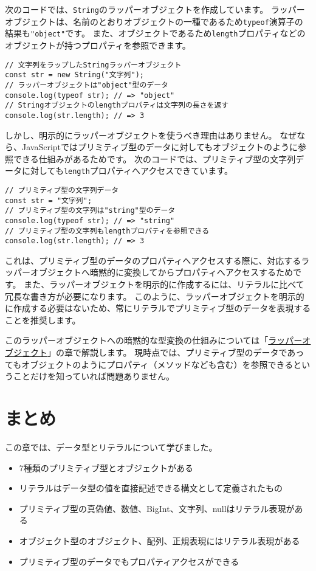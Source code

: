 次のコードでは、\texttt{String}のラッパーオブジェクトを作成しています。
ラッパーオブジェクトは、名前のとおりオブジェクトの一種であるため\texttt{typeof}演算子の結果も\texttt{"object"}です。
また、オブジェクトであるため\texttt{length}プロパティなどのオブジェクトが持つプロパティを参照できます。

\begin{lstlisting}
// 文字列をラップしたStringラッパーオブジェクト
const str = new String("文字列");
// ラッパーオブジェクトは"object"型のデータ
console.log(typeof str); // => "object"
// Stringオブジェクトのlengthプロパティは文字列の長さを返す
console.log(str.length); // => 3
\end{lstlisting}
\newpage
しかし、明示的にラッパーオブジェクトを使うべき理由はありません。
なぜなら、JavaScriptではプリミティブ型のデータに対してもオブジェクトのように参照できる仕組みがあるためです。
次のコードでは、プリミティブ型の文字列データに対しても\texttt{length}プロパティへアクセスできています。

\begin{lstlisting}
// プリミティブ型の文字列データ
const str = "文字列";
// プリミティブ型の文字列は"string"型のデータ
console.log(typeof str); // => "string"
// プリミティブ型の文字列もlengthプロパティを参照できる
console.log(str.length); // => 3
\end{lstlisting}

これは、プリミティブ型のデータのプロパティへアクセスする際に、対応するラッパーオブジェクトへ暗黙的に変換してからプロパティへアクセスするためです。
また、ラッパーオブジェクトを明示的に作成するには、リテラルに比べて冗長な書き方が必要になります。
このように、ラッパーオブジェクトを明示的に作成する必要はないため、常にリテラルでプリミティブ型のデータを表現することを推奨します。

このラッパーオブジェクトへの暗黙的な型変換の仕組みについては「\hyperlink{wrapper-object}{ラッパーオブジェクト}」の章で解説します。
現時点では、プリミティブ型のデータであってもオブジェクトのようにプロパティ（メソッドなども含む）を参照できるということだけを知っていれば問題ありません。

\hypertarget{data-type-summary}{%
\section{まとめ}\label{data-type-summary}}

この章では、データ型とリテラルについて学びました。

\begin{itemize}
\item
  7種類のプリミティブ型とオブジェクトがある
\item
  リテラルはデータ型の値を直接記述できる構文として定義されたもの
\item
  プリミティブ型の真偽値、数値、BigInt、文字列、nullはリテラル表現がある
\item
  オブジェクト型のオブジェクト、配列、正規表現にはリテラル表現がある
\item
  プリミティブ型のデータでもプロパティアクセスができる
\end{itemize}
